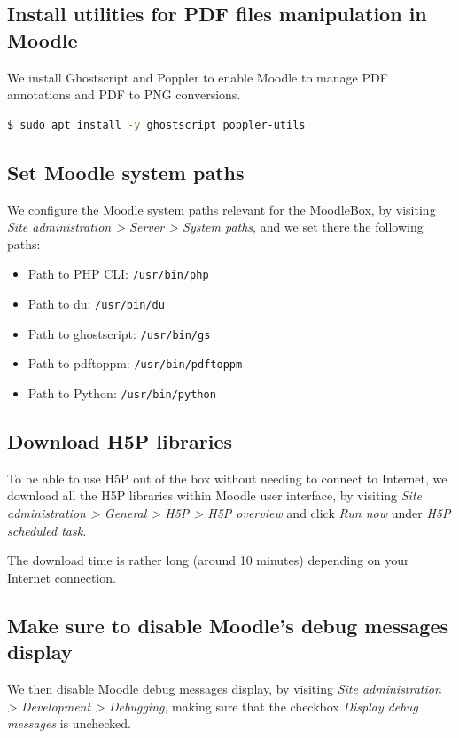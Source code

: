 \documentclass[12pt]{article}
\begin{document}
\subsection{Install utilities for PDF files manipulation in Moodle}

We install Ghostscript and Poppler to enable Moodle to manage PDF annotations and PDF to PNG conversions.
\begin{lstlisting}[language=bash]
$ sudo apt install -y ghostscript poppler-utils
\end{lstlisting}

\subsection{Set Moodle system paths}

We configure the Moodle system paths relevant for the MoodleBox, by visiting \emph{Site administration > Server > System paths}, and we set there the following paths:
\begin{itemize}
\item Path to PHP CLI: \texttt{/usr/bin/php}
\item Path to du: \texttt{/usr/bin/du}
\item Path to ghostscript: \texttt{/usr/bin/gs}
\item Path to pdftoppm: \texttt{/usr/bin/pdftoppm}
\item Path to Python: \texttt{/usr/bin/python}
\end{itemize}

\subsection{Download H5P libraries}

To be able to use H5P out of the box without needing to connect to Internet, we download all the H5P libraries within Moodle user interface, by visiting \emph{Site administration > General > H5P > H5P overview} and click \emph{Run now} under \emph{H5P scheduled task}.

The download time is rather long (around 10 minutes) depending on your Internet connection.

\subsection{Make sure to disable Moodle's debug messages display}

We then disable Moodle debug messages display, by visiting \emph{Site administration > Development > Debugging}, making sure that the checkbox \emph{Display debug messages} is unchecked.
\end{document}
